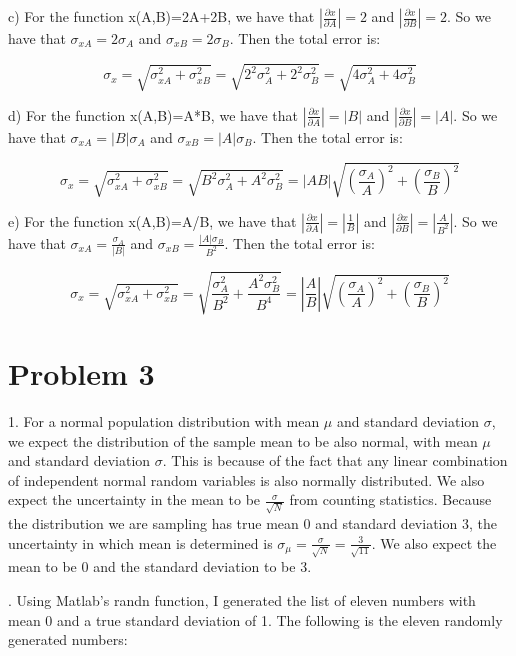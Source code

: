 \documentclass{article}
\begin{document}
\noindent c) For the function x(A,B)=2A+2B, we have that $|\frac{\partial x} {\partial A}|=2$ and $|\frac{\partial x}{\partial B}|=2$. So we have that $\sigma_{xA}=2\sigma_A$ and $\sigma_{xB}=2\sigma_B$. Then the total error is:

\[ \sigma_x=\sqrt{\sigma_{xA}^2+\sigma_{xB}^2}=\sqrt{2^2\sigma_{A}^2+2^2\sigma_{B}^2}=\boxed{\sqrt{4\sigma_{A} ^2+4\sigma_{B}^2}}\] 

\noindent d) For the function x(A,B)=A*B, we have that $|\frac{\partial x} {\partial A}|=|B|$ and $|\frac{\partial x}{\partial B}|=|A|$. So we have that $\sigma_{xA}=|B|\sigma_A$ and $\sigma_{xB}=|A|\sigma_B$. Then the total error is:

\[ \sigma_x=\sqrt{\sigma_{xA}^2+\sigma_{xB}^2}=\sqrt{B^2\sigma_{A}^2+A^2\sigma_{B}^2}=\boxed{|AB|\sqrt{(\frac{\sigma_{A}}{A})^2+(\frac{\sigma_{B}}{B})^2}}\] 

\noindent e) For the function x(A,B)=A/B, we have that $|\frac{\partial x} {\partial A}|=|\frac{1}{B}|$ and $|\frac{\partial x}{\partial B}|=|\frac{A}{B^2}|$. So we have that $\sigma_{xA}=\frac{\sigma_A}{|B|}$ and $\sigma_{xB}=\frac{|A|\sigma_B}{B^2}$. Then the total error is:

\[ \sigma_x=\sqrt{\sigma_{xA}^2+\sigma_{xB}^2}=\sqrt{\frac{\sigma_{A}^2}{B^2}+\frac{A^2\sigma_{B}^2}{B^4}}=\boxed{|\frac{A}{B}|\sqrt{(\frac{\sigma_{A}}{A})^2+(\frac{\sigma_{B}}{B})^2}}\] 

\section*{Problem 3}

1. For a normal population distribution with mean $\mu$ and standard deviation $\sigma$, we expect the distribution of the sample mean to be also normal, with mean $\mu$ and standard deviation $\sigma$. This is because of the fact that any linear combination of independent normal random variables is also normally distributed. We also expect the uncertainty in the mean to be $\frac{\sigma}{\sqrt{N}}$ from counting statistics. Because the distribution we are sampling has true mean 0 and standard deviation 3, the uncertainty in which mean is determined is $\sigma_{\mu}=\frac{\sigma}{\sqrt{N}}=\frac{3}{\sqrt{11}}$. We also expect the mean to be 0 and the standard deviation to be 3. \newline

. Using Matlab’s randn function, I generated the list of eleven numbers with mean 0 and a true standard deviation of 1. The following is the eleven randomly generated numbers:
\end{document}
